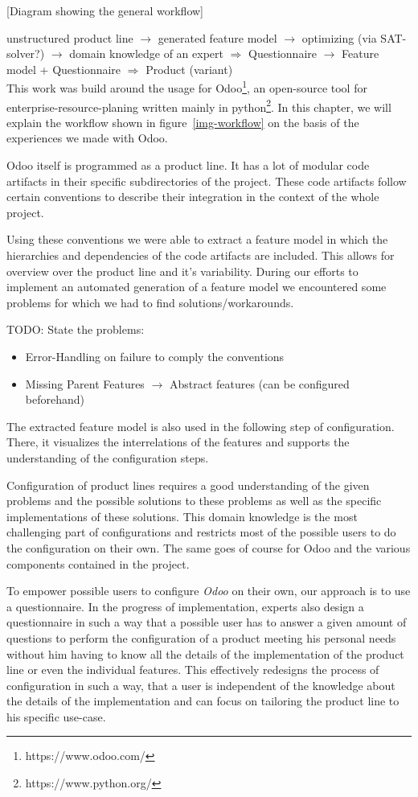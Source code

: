 [Diagram showing the general workflow]

unstructured product line $\rightarrow$ generated feature model $\rightarrow$ optimizing (via SAT-solver?) $\rightarrow$ domain knowledge of an expert $\Rightarrow$ Questionnaire $\rightarrow$ Feature model + Questionnaire $\Rightarrow$ Product (variant)\\

This work was build around the usage for Odoo\footnote{https://www.odoo.com/}, an open-source tool for enterprise-resource-planing written mainly in python\footnote{https://www.python.org/}. In this chapter, we will explain the workflow shown in figure~\ref{img-workflow} on the basis of the experiences we made with Odoo.

Odoo itself is programmed as a product line. It has a lot of modular code artifacts in their specific subdirectories of the project. These code artifacts follow certain conventions to describe their integration in the context of the whole project.

Using these conventions we were able to extract a feature model in which the hierarchies and dependencies of the code artifacts are included. This allows for overview over the product line and it's variability. During our efforts to implement an automated generation of a feature model we encountered some problems for which we had to find solutions/workarounds.

{\color{red}TODO: State the problems:
\begin{itemize}
\item Error-Handling on failure to comply the conventions
\item Missing Parent Features $\rightarrow$ Abstract features (can be configured beforehand)
\end{itemize}}

The extracted feature model is also used in the following step of configuration. There, it visualizes the interrelations of the features and supports the understanding of the configuration steps.

Configuration of product lines requires a good understanding of the given problems and the possible solutions to these problems as well as the specific implementations of these solutions. This domain knowledge is the most challenging part of configurations and restricts most of the possible users to do the configuration on their own. The same goes of course for Odoo and the various components contained in the project.

To empower possible users to configure \textit{Odoo} on their own, our approach is to use a questionnaire. In the progress of implementation, experts also design a questionnaire in such a way that a possible user has to answer a given amount of questions to perform the configuration of a product meeting his personal needs without him having to know all the details of the implementation of the product line or even the individual features. This effectively redesigns the process of configuration in such a way, that a user is independent of the knowledge about the details of the implementation and can focus on tailoring the product line to his specific use-case.

